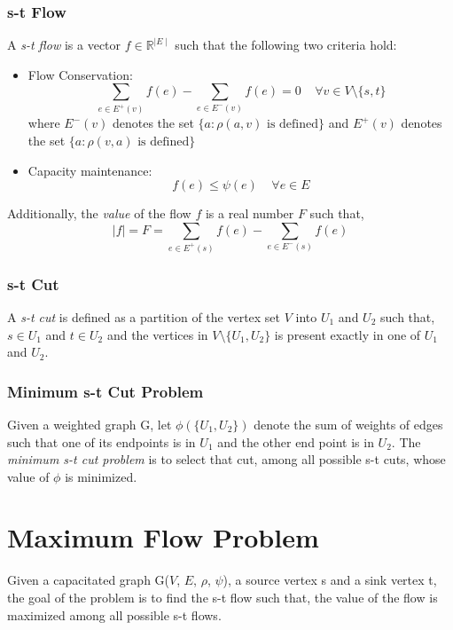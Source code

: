 \documentclass[BTech]{iitmdiss}
\begin{document}
      \subsubsection{s-t Flow}
	A \textit{s-t flow} is a vector $f \in \mathbb{R}^{\mid E \mid}$ such that the following two criteria hold:
	\begin{itemize}
	 \item 
	   Flow Conservation: $$\displaystyle\sum_{e \in E^+(v)} f(e)- \displaystyle\sum_{e \in E^-(v)} f(e) = 0 ~~~~~ \forall v \in V \setminus \{s,t\}$$
	   where $E^-(v)$ denotes the set $\{a: \rho(a,v) \text{ is defined}\}$ and $E^+(v)$ denotes the set $\{a: \rho(v,a) \text{ is defined}\}$
	 \item
	  Capacity maintenance:
	    $$f(e) \leq \psi(e)~~~~~\forall e \in E$$
	      
	\end{itemize}
	
	Additionally, the \textit{value} of the flow $f$ is a real number $F$ such that,
	$$\mid f\mid  = F = \displaystyle\sum_{e \in E^+(s)} f(e)- \displaystyle\sum_{e \in E^-(s)} f(e)$$
	
      \subsubsection{s-t Cut}
	A \textit{s-t cut} is defined as a partition of the vertex set $V$ into $U_1$ and $U_2$ such that, $s \in U_1$ and $t \in U_2$ and the vertices
	in $V \setminus \{U_1, U_2 \}$ is present exactly in one of $U_1$ and $U_2$.
      
      \subsubsection{Minimum s-t Cut Problem}
	Given a weighted graph G, let $\phi(\{U_1,U_2\})$ denote the sum of weights of edges such that one of its endpoints is in $U_1$ and the other
	end point is in $U_2$. The \textit{minimum s-t cut problem} is to select that cut, among all possible s-t cuts, whose value of $\phi$ is minimized.
      \section{Maximum Flow Problem}
	Given a capacitated graph G($V$, $E$, $\rho$, $\psi$), a source vertex s and a sink vertex t, the goal of the problem is to find the s-t flow
	such that, the value of the flow is maximized among all possible s-t flows. \\
	
\end{document}
